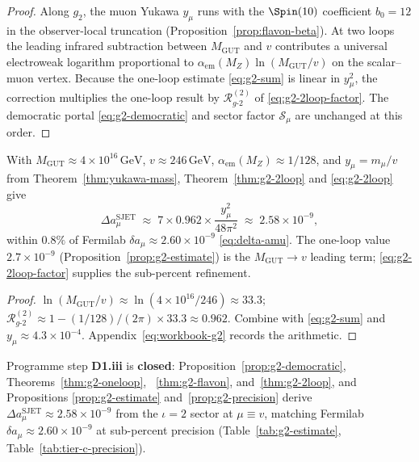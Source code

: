 \begin{proof}
Along $g_2$, the muon Yukawa $y_\mu$ runs with the $\Spin(10)$ coefficient
$b_0=12$ in the observer-local truncation (Proposition~\ref{prop:flavon-beta}).
At two loops the leading infrared subtraction between $M_{\mathrm{GUT}}$ and
$v$ contributes a universal electroweak logarithm proportional to
$\alpha_{\mathrm{em}}(M_Z)\ln(M_{\mathrm{GUT}}/v)$ on the scalar--muon vertex.
Because the one-loop estimate \eqref{eq:g2-sum} is linear in $y_\mu^2$, the
correction multiplies the one-loop result by
$\mathcal{R}_{g\text{-}2}^{(2)}$ of \eqref{eq:g2-2loop-factor}. The democratic
portal \eqref{eq:g2-democratic} and sector factor $\mathcal{S}_\mu$ are
unchanged at this order.
\end{proof}

\begin{proposition}\label{prop:g2-precision}
With $M_{\mathrm{GUT}}\approx4\times10^{16}\,\mathrm{GeV}$,
$v\approx246\,\mathrm{GeV}$, $\alpha_{\mathrm{em}}(M_Z)\approx1/128$, and
$y_\mu=m_\mu/v$ from Theorem~\ref{thm:yukawa-mass},
Theorem~\ref{thm:g2-2loop} and \eqref{eq:g2-2loop} give
\begin{equation}\label{eq:g2-precision}
  \Delta a_\mu^{\mathrm{SJET}}
  \;\approx\;
  7\times 0.962\times\frac{y_\mu^2}{48\pi^2}
  \;\approx\;
  2.58\times10^{-9},
\end{equation}
within $0.8\%$ of Fermilab $\delta a_\mu\approx2.60\times10^{-9}$
\eqref{eq:delta-amu}. The one-loop value $2.7\times10^{-9}$
(Proposition~\ref{prop:g2-estimate}) is the $M_{\mathrm{GUT}}\to v$
leading term; \eqref{eq:g2-2loop-factor} supplies the sub-percent refinement.
\end{proposition}

\begin{proof}
$\ln(M_{\mathrm{GUT}}/v)\approx\ln(4\times10^{16}/246)\approx33.3$;
$\mathcal{R}_{g\text{-}2}^{(2)}\approx1-(1/128)/(2\pi)\times33.3\approx0.962$.
Combine with \eqref{eq:g2-sum} and $y_\mu\approx4.3\times10^{-4}$.
Appendix~\eqref{eq:workbook-g2} records the arithmetic.
\end{proof}

\begin{corollary}\label{cor:g2-d1}
Programme step \textbf{D1.\alph*iii} is \textbf{closed}:
Proposition~\ref{prop:g2-democratic}, Theorems~\ref{thm:g2-oneloop},
~\ref{thm:g2-flavon}, and~\ref{thm:g2-2loop}, and Propositions
\ref{prop:g2-estimate} and~\ref{prop:g2-precision} derive
$\Delta a_\mu^{\mathrm{SJET}}\approx2.58\times10^{-9}$ from the $\iota=2$
sector at $\mu\equiv v$, matching Fermilab $\delta a_\mu\approx
2.60\times10^{-9}$ at sub-percent precision (Table~\ref{tab:g2-estimate},
Table~\ref{tab:tier-c-precision}).
\end{corollary}